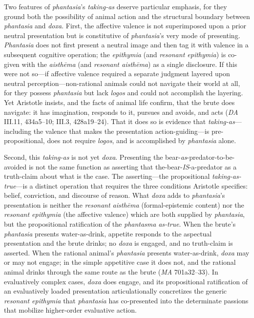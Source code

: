 Two features of \textit{phantasia}'s \textit{taking-as} deserve particular emphasis, for they ground both the possibility of animal action and the structural boundary between \textit{phantasia} and \textit{doxa}. First, the affective valence is not superimposed upon a prior neutral presentation but is constitutive of \textit{phantasia}'s very mode of presenting. \textit{Phantasia} does not first present a neutral image and then tag it with valence in a subsequent cognitive operation; the \textit{epithymia} (and \textit{resonant epithymia}) is co-given with the \textit{aisthēma} (and \textit{resonant aisthēma}) as a single disclosure. If this were not so---if affective valence required a separate judgment layered upon neutral perception---non-rational animals could not navigate their world at all, for they possess \textit{phantasia} but lack \textit{logos} and could not accomplish the layering. Yet Aristotle insists, and the facts of animal life confirm, that the brute does navigate: it has imagination, responds to it, pursues and avoids, and acts (\textit{DA} III.11, 434a5--10; III.3, 428a19--24). That it does so is evidence that \textit{taking-as}---including the valence that makes the presentation action-guiding---is pre-propositional, does not require \textit{logos}, and is accomplished by \textit{phantasia} alone.

Second, this \textit{taking-as} is not yet \textit{doxa}. Presenting the bear-\textit{as}-predator-to-be-avoided is not the same function as asserting that the-bear-\textit{IS}-a-predator as a truth-claim about what is the case. The asserting---the propositional \textit{taking-as-true}---is a distinct operation that requires the three conditions Aristotle specifies: belief, conviction, and discourse of reason. What \textit{doxa} adds to \textit{phantasia}'s presentation is neither the \textit{resonant aisthēma} (formal-epistemic content) nor the \textit{resonant epithymia} (the affective valence) which are both supplied by \textit{phantasia}, but the propositional ratification of the \textit{phantasma} \textit{as-true}. When the brute's \textit{phantasia} presents water-as-drink, appetite responds to the aspectual presentation and the brute drinks; no \textit{doxa} is engaged, and no truth-claim is asserted. When the rational animal's \textit{phantasia} presents water-as-drink, \textit{doxa} may or may not engage; in the simple appetitive case it does not, and the rational animal drinks through the same route as the brute (\textit{MA} 701a32--33). In evaluatively complex cases, \textit{doxa} does engage, and its propositional ratification of an evaluatively loaded presentation articulationally concretizes the generic \textit{resonant epithymia} that \textit{phantasia} has co-presented into the determinate passions that mobilize higher-order evaluative action.

